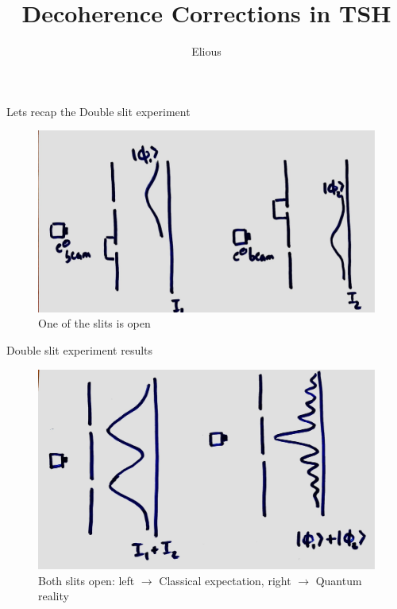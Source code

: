 \documentclass{beamer}
\title{Decoherence Corrections in TSH}
\author{Elious}
\date{}
\begin{document}
	\begin{frame}
	\titlepage
	\end{frame}
	\begin{frame}[t]{Lets recap the Double slit experiment}
	\begin{center}
	\begin{figure}
	\includegraphics[scale=0.15]{initial_cases.jpg}
	\caption{One of the slits is open}
	\end{figure}
	\end{center}
	\end{frame}
	
	\begin{frame}[t]{Double slit experiment results}
	\begin{center}
	\begin{figure}
	\includegraphics[scale=0.12]{classical_vs_quantum.jpg}
	\caption{Both slits open: left $\rightarrow$ Classical expectation, right $\rightarrow$ Quantum reality}
	\end{figure}
	\end{center}
	\end{frame}
	
\end{document}
